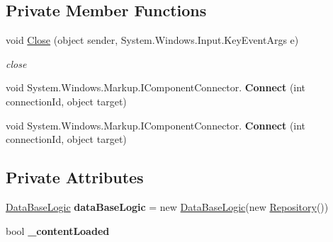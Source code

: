 \subsection*{Private Member Functions}
\begin{DoxyCompactItemize}
\item 
void \mbox{\hyperlink{class_bomberman_1_1_u_i_1_1_high_score_window_a2f8852050224692009bcdb725ec8a774}{Close}} (object sender, System.\+Windows.\+Input.\+Key\+Event\+Args e)
\begin{DoxyCompactList}\small\item\em close \end{DoxyCompactList}\item 
\mbox{\label{class_bomberman_1_1_u_i_1_1_high_score_window_a2f8361dfa124cd9a3d19ed4b418e1dd1}} 
void System.\+Windows.\+Markup.\+I\+Component\+Connector. {\bfseries Connect} (int connection\+Id, object target)
\item 
\mbox{\label{class_bomberman_1_1_u_i_1_1_high_score_window_a2f8361dfa124cd9a3d19ed4b418e1dd1}} 
void System.\+Windows.\+Markup.\+I\+Component\+Connector. {\bfseries Connect} (int connection\+Id, object target)
\end{DoxyCompactItemize}
\subsection*{Private Attributes}
\begin{DoxyCompactItemize}
\item 
\mbox{\label{class_bomberman_1_1_u_i_1_1_high_score_window_a1fd730c2fcc41a82b3155ba03f740022}} 
\mbox{\hyperlink{class_bomberman_1_1_business_logic_1_1_data_base_logic}{Data\+Base\+Logic}} {\bfseries data\+Base\+Logic} = new \mbox{\hyperlink{class_bomberman_1_1_business_logic_1_1_data_base_logic}{Data\+Base\+Logic}}(new \mbox{\hyperlink{class_bomberman_1_1_repository_1_1_repository}{Repository}}())
\item 
\mbox{\label{class_bomberman_1_1_u_i_1_1_high_score_window_a445186b0b1c3bca671f13cc892b9c120}} 
bool {\bfseries \+\_\+content\+Loaded}
\end{DoxyCompactItemize}


